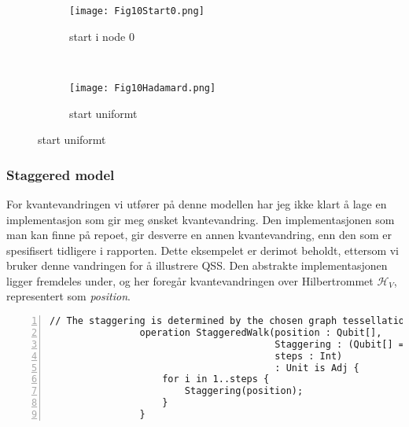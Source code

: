             \begin{figure}
                \begin{center}
                    \caption{Kvantevadnring over \ref{fig:shuriken}}
                    \begin{subfigure}{0.6\textwidth}
                        \begin{center}
                            \caption{start i node $0$}
                            \texttt{[image: Fig10Start0.png]}
                        \end{center}
                    \end{subfigure} \\
                    \begin{subfigure}{0.6\textwidth}
                        \begin{center}
                            \caption{start uniformt}
                            \texttt{[image: Fig10Hadamard.png]}
                        \end{center}
                    \end{subfigure}
                    \label{fig:shuriken vandring}
                \end{center}
            \end{figure}
       
        \subsubsection{Staggered model}

            For kvantevandringen vi utfører på denne modellen har jeg ikke klart å lage en implementasjon som gir meg ønsket kvantevandring. Den implementasjonen som man kan finne på repoet, gir desverre en annen kvantevandring, enn den som er spesifisert tidligere i rapporten. Dette eksempelet er derimot beholdt, ettersom vi bruker denne vandringen for å illustrere QSS. Den abstrakte implementasjonen ligger fremdeles under, og her foregår kvantevandringen over Hilbertrommet $\mathcal{H}_V$, representert som \emph{position}.
                
            \begin{Verbatim}[gobble=2, numbers=left, frame=lines,
                framesep=3mm,
                label={[Beginning of code]End of code}]
                // The staggering is determined by the chosen graph tessellation cover
                operation StaggeredWalk(position : Qubit[], 
                                        Staggering : (Qubit[] => Unit is Adj), 
                                        steps : Int) 
                                        : Unit is Adj {
                    for i in 1..steps {
                        Staggering(position);
                    }
                }
            \end{Verbatim}

